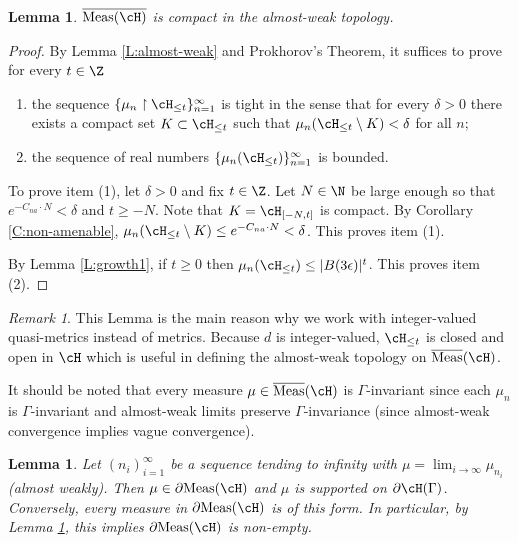 \documentclass[12pt]{article}
\theoremstyle{plain}
\newtheorem{lem}[thm]{Lemma}
\theoremstyle{definition}
\theoremstyle{remark}
\newtheorem{remark}{Remark}
\newcommand{\G}{\Gamma}
\newcommand{\eps}{\epsilon}
\newcommand\Meas{{\operatorname{Meas}}}
\newcommand{\resto}{\upharpoonright}
\begin{document}
\begin{lem}\label{L:compact}
    $\overline{\Meas(\cH)}$ is compact in the almost-weak topology.
\end{lem}

\begin{proof}
    By Lemma \ref{L:almost-weak} and Prokhorov's Theorem, it suffices to prove for every $t\in \Z$
    \begin{enumerate}
        \item the sequence $\{\mu_n\resto \cH_{\le t}\}_{n=1}^\infty$ is tight in the sense that for every $\delta>0$ there exists a compact set $K \subset \cH_{\le t}$ such that $\mu_n(\cH_{\le t} \setminus K)<\delta$ for all $n$;
        \item the sequence of real numbers $\{\mu_n(\cH_{\le t})\}_{n=1}^\infty$ is bounded.
    \end{enumerate}

To prove item (1), let $\delta>0$ and fix $t\in \Z$. Let $N \in \N$ be large enough so that $e^{-C_{na}\cdot N} < \delta$ and $t \ge -N$. Note that $K = \cH_{[-N,t]}$ is compact. By Corollary \ref{C:non-amenable}, $\mu_n(\cH_{\le t} \setminus K) \le e^{-C_{na}\cdot N} < \delta$. This proves item (1). 

By Lemma \ref{L:growth1}, if $t \ge 0$ then $\mu_n(\cH_{\le t}) \le |B(3\eps)|^t$. This proves item (2). 
\end{proof}

    \begin{remark}
    This Lemma is the main reason why we work with integer-valued quasi-metrics instead of metrics. Because $d$ is integer-valued,  $\cH_{\le t}$ is closed and open in $\cH$ which is useful in defining the almost-weak  topology on $\overline{\Meas}(\cH)$.
\end{remark}

It should be noted that every measure $\mu \in \overline{\Meas}(\cH)$ is $\G$-invariant since each $\mu_n$ is $\G$-invariant and almost-weak limits preserve $\G$-invariance (since almost-weak convergence implies vague convergence). 


\begin{lem}\label{L:support}
  Let $(n_i)_{i=1}^\infty$ be a sequence tending to infinity with $\mu = \lim_{i\to\infty} \mu_{n_i}$ (almost weakly). Then $\mu \in \partial \Meas(\cH)$ and $\mu$ is supported on $\partial \cH(\G)$. Conversely, every measure in $\partial \Meas(\cH)$ is of this form.
  In particular, by Lemma \ref{L:compact}, this implies $\partial \Meas(\cH)$ is non-empty.
\end{lem}
\end{document}
